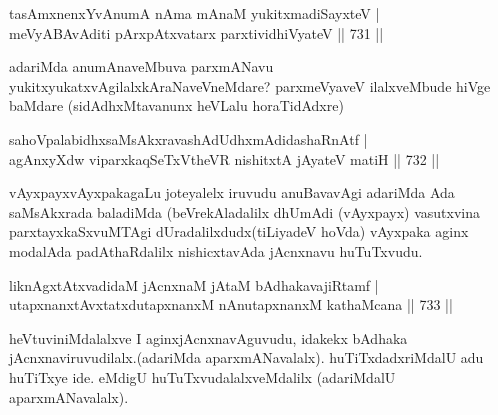 \begin{shl}
tasAmxnenxYvAnumA nAma mAnaM yukitxmadiSayxteV | \\
meVyABAvAditi pArxpAtxvatarx parxtividhiVyateV \hfill||  731 ||  
\end{shl}

\begin{artha}
adariMda anumAnaveMbuva parxmANavu yukitxyukatxvAgilalxkAraNaveVneMdare? parxmeVyaveV ilalxveMbude hiVge baMdare (sidAdhxMtavanunx heVLalu horaTidAdxre)
\end{artha}


\begin{shl}
\footnotemark[1]sahoVpalabidhxsaMsAkxravashAdUdhxmAdidashaRnAtf | \\
agAnxyXdw viparxkaqSeTxV\s theVR nishitxtA jAyateV matiH \hfill||  732 ||  
\end{shl}

\begin{artha}
vAyxpayxvAyxpakagaLu joteyalelx iruvudu anuBavavAgi adariMda Ada saMsAkxrada baladiMda (beVrekAladalilx dhUmAdi (vAyxpayx) vasutxvina parxtayxkaSxvuMTAgi dUradalilxdudx(tiLiyadeV hoVda) vAyxpaka aginx modalAda padAthaRdalilx nishicxtavAda jAcnxnavu huTuTxvudu.
\end{artha}

\begin{shl}
liknAgxtAtxvadidaM jAcnxnaM jAtaM bAdhakavajiRtamf | \\
\footnotemark[1]utapxnanxtAvxtatxdutapxnanxM nAnutapxnanxM kathaMcana \hfill||  733 ||  
\end{shl}

\begin{artha}
heVtuviniMdalalxve  I aginxjAcnxnavAguvudu, idakekx bAdhaka jAcnxnaviruvudilalx.(adariMda aparxmANavalalx). huTiTxdadxriMdalU adu huTiTxye ide. eMdigU huTuTxvudalalxveMdalilx (adariMdalU aparxmANavalalx).
\end{artha}

